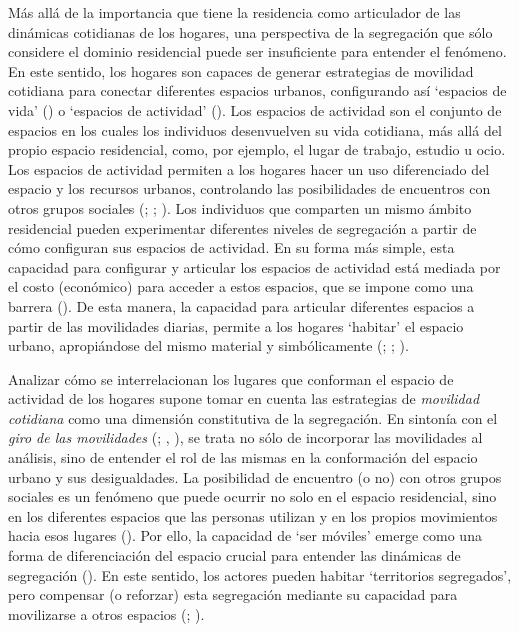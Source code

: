 \documentclass[
  spanish,
  a4paper,%
  chapterprefix=true,%
  DIV=calc,%
  twoside]{scrbook}%
\begin{document}
Más allá de la importancia que tiene la residencia como articulador de
las dinámicas cotidianas de los hogares, una perspectiva de la
segregación que sólo considere el dominio residencial puede ser
insuficiente para entender el fenómeno.
En
este sentido, los hogares son capaces de generar estrategias de
movilidad cotidiana para conectar diferentes espacios urbanos,
configurando así `espacios de vida' () o `espacios de
actividad' (). Los espacios de actividad son el conjunto de
espacios en los cuales los individuos desenvuelven su vida cotidiana,
más allá del propio espacio residencial, como, por ejemplo, el lugar de
trabajo, estudio u ocio. Los espacios de actividad permiten a los
hogares hacer un uso diferenciado del espacio y los recursos urbanos,
controlando las posibilidades de encuentros con otros grupos sociales
(; ; ). Los individuos que comparten un
mismo ámbito residencial pueden experimentar diferentes niveles de
segregación a partir de cómo configuran sus espacios de actividad. En su
forma más simple, esta capacidad para configurar y articular los
espacios de actividad está mediada por el costo (económico) para acceder
a estos espacios, que se impone como una barrera (). De esta
manera, la capacidad para articular diferentes espacios a partir de las
movilidades diarias, permite a los hogares `habitar' el espacio urbano,
apropiándose del mismo material y simbólicamente (; ; ).

Analizar cómo se interrelacionan los lugares que conforman el espacio de
actividad de los hogares supone tomar en cuenta las estrategias de
\emph{movilidad cotidiana} como una dimensión constitutiva de la segregación.
En sintonía con el \emph{giro de las movilidades} (; , ), se trata no sólo de incorporar las movilidades al
análisis, sino de entender el rol de las mismas en la conformación del
espacio urbano y sus desigualdades. La posibilidad de encuentro (o no)
con otros grupos sociales es un fenómeno que puede ocurrir no solo en el
espacio residencial, sino en los diferentes espacios que las personas
utilizan y en los propios movimientos hacia esos lugares
(). Por ello, la capacidad de `ser móviles' emerge como
una forma de diferenciación del espacio crucial para entender las
dinámicas de segregación (). En este sentido, los actores
pueden habitar `territorios segregados', pero compensar (o reforzar)
esta segregación mediante su capacidad para movilizarse a otros espacios
(; ).
\end{document}
